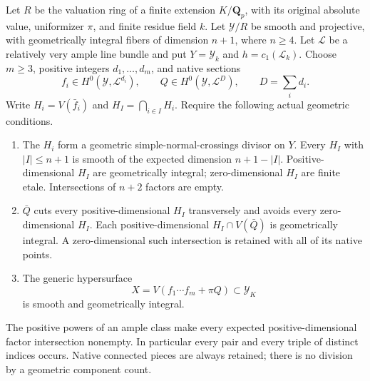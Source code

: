 Let $R$ be the valuation ring of a finite extension $K/\mathbf Q_p$,
with its original absolute value, uniformizer $\pi$, and finite
residue field $k$.  Let $\mathcal Y/R$ be smooth and projective,
with geometrically integral fibers of dimension $n+1$, where $n\ge4$.
Let $\mathcal L$ be a relatively very ample line bundle and put
$Y=\mathcal Y_k$ and $h=c_1(\mathcal L_k)$.
Choose $m\ge3$, positive integers $d_1,\ldots,d_m$, and native sections
\[
 f_i\in H^0(\mathcal Y,\mathcal L^{d_i}),\qquad
 Q\in H^0(\mathcal Y,\mathcal L^{D}),\qquad D=\sum_i d_i.
 \tag{PG18.1}\label{r18pg:sections}
\]
Write $H_i=V(\bar f_i)$ and $H_I=\bigcap_{i\in I}H_i$.
Require the following actual geometric conditions.
\begin{enumerate}
\item The $H_i$ form a geometric simple-normal-crossings divisor on
      $Y$.  Every $H_I$ with $|I|\le n+1$ is smooth of the expected
      dimension $n+1-|I|$.  Positive-dimensional $H_I$ are geometrically
      integral; zero-dimensional $H_I$ are finite etale.  Intersections
      of $n+2$ factors are empty.
\item $\bar Q$ cuts every positive-dimensional $H_I$ transversely and
      avoids every zero-dimensional $H_I$.  Each positive-dimensional
      $H_I\cap V(\bar Q)$ is geometrically integral.  A zero-dimensional
      such intersection is retained with all of its native points.
\item The generic hypersurface
      \[
        X=V(f_1\cdots f_m+\pi Q)\subset\mathcal Y_K
        \tag{PG18.2}\label{r18pg:generic}
      \]
      is smooth and geometrically integral.
\end{enumerate}
The positive powers of an ample class make every expected
positive-dimensional factor intersection nonempty.  In particular
every pair and every triple of distinct indices occurs.  Native
connected pieces are always retained; there is no division by a
geometric component count.

